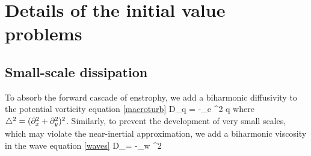 \documentclass{jfm}
\begin{document}
%




\section{Details of the initial value problems}

\subsection{Small-scale dissipation}
To absorb the forward cascade of enstrophy, we add a biharmonic diffusivity to the
potential vorticity equation \eqref{macroturb}
\beq
D_q = -\kappa_e \lap^2 q\com
\eeq
where $\triangle^2 = (\partial_x^2+\partial_y^2)^2$.
Similarly, to prevent the development of very small scales, which may violate the
near-inertial approximation, we add a biharmonic viscosity in the wave equation
\eqref{waves}
\beq
D_\phi = -\nu_w \lap^2 \phi\per
\eeq
\end{document}
